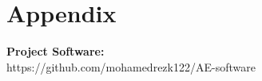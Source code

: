 \chapter*{Appendix}

\LARGE \noindent \textbf{Project Software:}\\https://github.com/mohamedrezk122/AE-software

